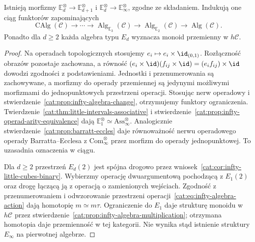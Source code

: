 \begin{stwierdzenie}\label{cat:prop:infty-en-restrictions}
Istnieją morfizmy $\mathbb E_d^\otimes\to\mathbb E_{d+1}^\otimes$ i $\mathbb E_d^\otimes\to\mathbb E_\infty^\otimes$, zgodne ze składaniem. Indukują one ciąg funktorów zapominających
\[
 \operatorname{CAlg}(\mathcal C)\longrightarrow\cdots
 \longrightarrow\operatorname{Alg}_{\mathbb E_3}(\mathcal C)
 \longrightarrow\operatorname{Alg}_{\mathbb E_2}(\mathcal C)
 \longrightarrow\operatorname{Alg}(\mathcal C).
\]
Ponadto dla $d\geq2$ każda algebra typu $E_d$ wyznacza monoid przemienny w $h\mathcal C$.
\end{stwierdzenie}
\begin{proof}
Na operadach topologicznych stosujemy $e_i\mapsto e_i\times\id_{(0,1)}$. Rozłączność obrazów pozostaje zachowana, a równość $(e_i\times\id)(f_{ij}\times\id)=(e_if_{ij})\times\id$ dowodzi zgodności z podstawieniami. Jednostki i przenumerowania są zachowywane, a morfizmy do operady przemiennej są jedynymi możliwymi morfizmami do jednopunktowych przestrzeni operacji. Stosując nerw operadowy i stwierdzenie~\ref{cat:prop:infty-algebra-change}, otrzymujemy funktory ograniczenia. Twierdzenie~\ref{cat:thm:little-intervals-associative} i stwierdzenie~\ref{cat:prop:infty-operad-arity-equivalence} dają $\mathbb E_1^\otimes\simeq\mathrm{Ass}_\infty^\otimes$. Analogicznie stwierdzenie~\ref{cat:prop:barratt-eccles} daje równoważność nerwu operadowego operady Barratta--Ecclesa z $\mathrm{Com}_\infty^\otimes$ przez morfizm do operady jednopunktowej. To uzasadnia oznaczenia w ciągu.

Dla $d\geq2$ przestrzeń $E_d(2)$ jest spójna drogowo przez wniosek~\ref{cat:cor:infty-little-cubes-binary}. Wybierzmy operację dwuargumentową pochodzącą z $E_1(2)$ oraz drogę łączącą ją z operacją o zamienionych wejściach. Zgodność z przenumerowaniem i odwzorowanie przestrzeni operacji~\eqref{cat:eq:infty-algebra-action} dają homotopię $m\simeq m\tau$. Ograniczenie do $E_1$ daje strukturę monoidu w $h\mathcal C$ przez stwierdzenie~\ref{cat:prop:infty-algebra-multiplication}; otrzymana homotopia daje przemienność w tej kategorii. Nie wynika stąd istnienie struktury $E_\infty$ na pierwotnej algebrze.
\end{proof}

